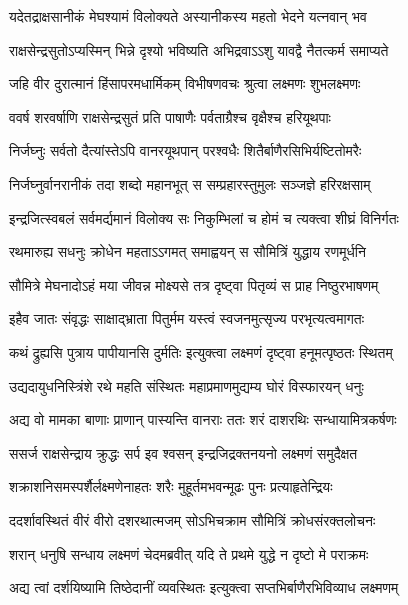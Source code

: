 \twolineshloka
{यदेतद्राक्षसानीकं मेघश्यामं विलोक्यते}
{अस्यानीकस्य महतो भेदने यत्नवान् भव} %

\twolineshloka
{राक्षसेन्द्रसुतोऽप्यस्मिन् भिन्ने दृश्यो भविष्यति}
{अभिद्रवाऽऽशु यावद्वै नैतत्कर्म समाप्यते} %

\twolineshloka
{जहि वीर दुरात्मानं हिंसापरमधार्मिकम्}
{विभीषणवचः श्रुत्वा लक्ष्मणः शुभलक्ष्मणः} %

\twolineshloka
{ववर्ष शरवर्षाणि राक्षसेन्द्रसुतं प्रति}
{पाषाणैः पर्वताग्रैश्च वृक्षैश्च हरियूथपाः} %

\twolineshloka
{निर्जघ्नुः सर्वतो दैत्यांस्तेऽपि वानरयूथपान्}
{परश्वधैः शितैर्बाणैरसिभिर्यष्टितोमरैः} %

\twolineshloka
{निर्जघ्नुर्वानरानीकं तदा शब्दो महानभूत्}
{स सम्प्रहारस्तुमुलः सञ्जज्ञे हरिरक्षसाम्} %

\twolineshloka
{इन्द्रजित्स्वबलं सर्वमर्द्यमानं विलोक्य सः}
{निकुम्भिलां च होमं च त्यक्त्वा शीघ्रं विनिर्गतः} %

\twolineshloka
{रथमारुह्य सधनुः क्रोधेन महताऽऽगमत्}
{समाह्वयन् स सौमित्रिं युद्धाय रणमूर्धनि} %

\twolineshloka
{सौमित्रे मेघनादोऽहं मया जीवन्न मोक्ष्यसे}
{तत्र दृष्ट्वा पितृव्यं स प्राह निष्ठुरभाषणम्} %

\twolineshloka
{इहैव जातः संवृद्धः साक्षाद्\mbox{}भ्राता पितुर्मम}
{यस्त्वं स्वजनमुत्सृज्य परभृत्यत्वमागतः} %

\twolineshloka
{कथं द्रुह्यसि पुत्राय पापीयानसि दुर्मतिः}
{इत्युक्त्वा लक्ष्मणं दृष्ट्वा हनूमत्पृष्ठतः स्थितम्} %

\twolineshloka
{उद्यदायुधनिस्त्रिंशे रथे महति संस्थितः}
{महाप्रमाणमुद्यम्य घोरं विस्फारयन् धनुः} %

\twolineshloka
{अद्य वो मामका बाणाः प्राणान् पास्यन्ति वानराः}
{ततः शरं दाशरथिः सन्धायामित्रकर्षणः} %

\twolineshloka
{ससर्ज राक्षसेन्द्राय क्रुद्धः सर्प इव श्वसन्}
{इन्द्रजिद्रक्तनयनो लक्ष्मणं समुदैक्षत} %

\twolineshloka
{शक्राशनिसमस्पर्शैर्लक्ष्मणेनाहतः शरैः}
{मुहूर्तमभवन्मूढः पुनः प्रत्याहृतेन्द्रियः} %

\twolineshloka
{ददर्शावस्थितं वीरं वीरो दशरथात्मजम्}
{सोऽभिचक्राम सौमित्रिं क्रोधसंरक्तलोचनः} %

\twolineshloka
{शरान् धनुषि सन्धाय लक्ष्मणं चेदमब्रवीत्}
{यदि ते प्रथमे युद्धे न दृष्टो मे पराक्रमः} %

\twolineshloka
{अद्य त्वां दर्शयिष्यामि तिष्ठेदानीं व्यवस्थितः}
{इत्युक्त्वा सप्तभिर्बाणैरभिविव्याध लक्ष्मणम्} %

